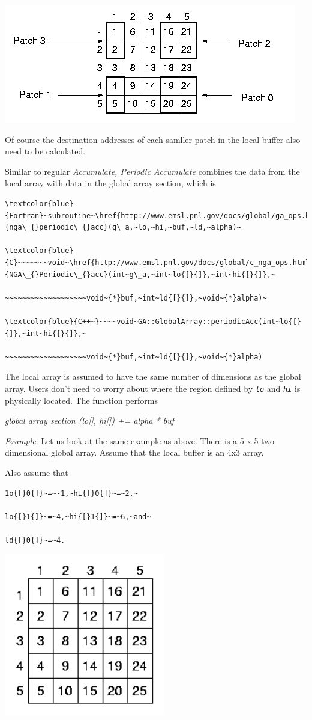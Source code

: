 \includegraphics[width=0.7\paperwidth]{periodic4}

Of course the destination addresses of each samller patch in the local
buffer also need to be calculated.

Similar to regular \emph{Accumulate, Periodic Accumulate} combines
the data from the local array with data in the global array section,
which is
\begin{verbatim}
\textcolor{blue}{Fortran}~subroutine~\href{http://www.emsl.pnl.gov/docs/global/ga_ops.html\#ga_periodic_acc}{nga\_{}periodic\_{}acc}(g\_a,~lo,~hi,~buf,~ld,~alpha)~

\textcolor{blue}{C}~~~~~~~void~\href{http://www.emsl.pnl.gov/docs/global/c_nga_ops.html\#ga_periodic_acc}{NGA\_{}Periodic\_{}acc}(int~g\_a,~int~lo{[}{]},~int~hi{[}{]},~

~~~~~~~~~~~~~~~~~~~void~{*}buf,~int~ld{[}{]},~void~{*}alpha)~

\textcolor{blue}{C++~}~~~~void~GA::GlobalArray::periodicAcc(int~lo{[}{]},~int~hi{[}{]},~

~~~~~~~~~~~~~~~~~~~void~{*}buf,~int~ld{[}{]},~void~{*}alpha)
\end{verbatim}
The local array is assumed to have the same number of dimensions as
the global array. Users don't need to worry about where the region
defined by \texttt{\emph{lo}} and \texttt{\emph{hi}} is physically
located. The function performs

\emph{global array section (lo{[}{]}, hi{[}{]}) += alpha {*} buf}

\emph{Example}: Let us look at the same example as above. There is
a 5 x 5 two dimensional global array. Assume that the local buffer
is an 4x3 array. 

Also assume that
\begin{verbatim}
1o{[}0{]}~=~-1,~hi{[}0{]}~=~2,~

lo{[}1{]}~=~4,~hi{[}1{]}~=~6,~and~

ld{[}0{]}~=~4.
\end{verbatim}
\includegraphics[width=7cm]{periodic1}

